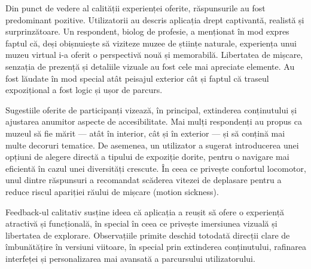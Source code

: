 Din punct de vedere al calității experienței oferite, răspunsurile au fost predominant pozitive. Utilizatorii au descris aplicația drept captivantă, realistă și surprinzătoare. Un respondent, biolog de profesie, a menționat în mod expres faptul că, deși obișnuiește să viziteze muzee de științe naturale, experiența unui muzeu virtual i-a oferit o perspectivă nouă și memorabilă. Libertatea de mișcare, senzația de prezență și detaliile vizuale au fost cele mai apreciate elemente. Au fost lăudate în mod special atât peisajul exterior cât și faptul că traseul expozițional a fost logic și ușor de parcurs.

Sugestiile oferite de participanți vizează, în principal, extinderea conținutului și ajustarea anumitor aspecte de accesibilitate. Mai mulți respondenți au propus ca muzeul să fie mărit — atât în interior, cât și în exterior — și să conțină mai multe decoruri tematice. De asemenea, un utilizator a sugerat introducerea unei opțiuni de alegere directă a tipului de expoziție dorite, pentru o navigare mai eficientă în cazul unei diversități crescute. În ceea ce privește confortul locomotor, unul dintre răspunsuri a recomandat scăderea vitezei de deplasare pentru a reduce riscul apariției răului de mișcare (motion sickness).

Feedback-ul calitativ susține ideea că aplicația a reușit să ofere o experiență atractivă și funcțională, în special în ceea ce privește imersiunea vizuală și libertatea de explorare. Observațiile primite deschid totodată direcții clare de îmbunătățire în versiuni viitoare, în special prin extinderea conținutului, rafinarea interfeței și personalizarea mai avansată a parcursului utilizatorului.

